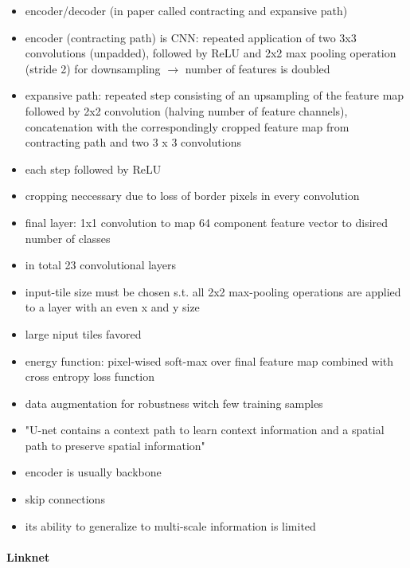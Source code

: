 \begin{itemize}
	\item encoder/decoder (in paper called contracting and expansive path)
	\item encoder (contracting path) is CNN: repeated application of two 3x3 convolutions (unpadded), followed by ReLU and 2x2 max pooling operation (stride 2) for downsampling $\rightarrow$ number of features is doubled
	\item expansive path: repeated step consisting of an upsampling of the feature map followed by 2x2 convolution (halving number of feature channels), concatenation with the correspondingly cropped feature map from contracting path and two 3 x 3 convolutions
	\item each step followed by ReLU
	\item cropping neccessary due to loss of border pixels in every convolution
	\item final layer: 1x1 convolution to map 64 component feature vector to disired number of classes
	\item in total 23 convolutional layers
	\item input-tile size must be chosen s.t. all 2x2 max-pooling operations are applied to a layer with an even x and y size
	\item large niput tiles favored
	\item energy function: pixel-wised soft-max over final feature map combined with cross entropy loss function
	\item data augmentation for robustness witch few training samples
	\item "U-net contains a context path to learn context information and a spatial path to preserve spatial information" \cite{MO2022626}
	\item encoder is usually backbone \cite{MO2022626}
	\item skip connections
	\item its ability to generalize to multi-scale information is limited \cite{Norelyaqine2023}
\end{itemize}

\paragraph{Linknet}

